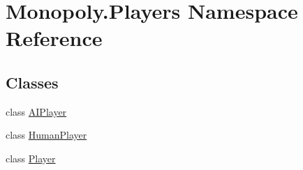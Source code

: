 \hypertarget{namespace_monopoly_1_1_players}{}\section{Monopoly.\+Players Namespace Reference}
\label{namespace_monopoly_1_1_players}
\subsection*{Classes}
\begin{DoxyCompactItemize}
\item 
class \mbox{\hyperlink{class_monopoly_1_1_players_1_1_a_i_player}{A\+I\+Player}}
\item 
class \mbox{\hyperlink{class_monopoly_1_1_players_1_1_human_player}{Human\+Player}}
\item 
class \mbox{\hyperlink{class_monopoly_1_1_players_1_1_player}{Player}}
\end{DoxyCompactItemize}
